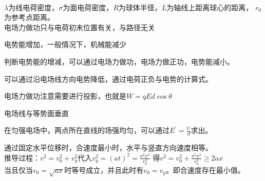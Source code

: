 \documentclass[a4paper, landscape, 10pt, twocolumn]{article}
\begin{document}
\\
$\lambda$为线电荷密度，$\sigma$为面电荷密度，$R$为球体半径，$L$为轴线上距离球心的距离，
$r_0$为参考点距离。\\
电场力做功只与电荷初末位置有关，与路径无关
\begin{compactitem}
  \item 电势能增加，一般情况下，机械能减少
  \item 判断电势能的增减，可以通过电场力做功，电场力做正功，电势能减小。
  \item 可以通过沿电场线方向电势降低，通过电荷正负与电势的计算式。
  \item 电场力做功注意需要进行投影，也就是$W=qEd\cos\theta$
  \item 电场线与等势面垂直
  \item 在匀强电场中，两点所在直线的场强均匀，可以通过$E^{'}=\frac Ud$求出。
\end{compactitem}
通过固定水平位移时，合速度最小时，水平与竖直方向速度相等。\\
推导过程：$v^2=v_0^2+v_y^2$代入$v_y^2=(at)^2=\frac{a^2x^2}{v_0^2}$
得$v^2=v_0^2+\frac{a^2x^2}{v_0^2}\ge 2ax$\\
当且仅当$v_0=\sqrt{ax}$时等号成立，并且此时有$v_0=v_y$。即合速度存在最小值。
\end{document}
